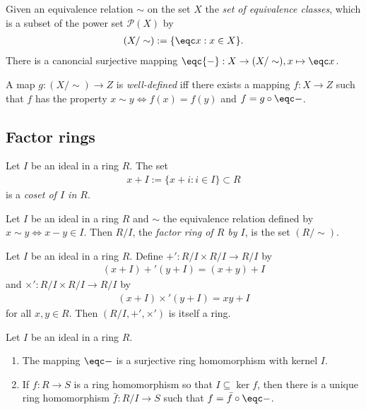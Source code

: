 \documentclass{article}
\begin{document}
\begin{definition}
	Given an equivalence relation $\sim$ on the set $X$ the \emph{set of equivalence classes},
	which is a subset of the power set $\mathcal{P}(X)$ by
	\begin{align*}
		(X/\sim) := \{\eqc x : x \in X\}.
	\end{align*}
	There is a canoncial surjective mapping $\eqc{-}:X\to (X/\sim),x\mapsto\eqc x$.
\end{definition}

\begin{definition}
	A map $g:(X/\sim)\to Z$ is \emph{well-defined} iff there exists a mapping $f:X\to Z$
	such that $f$ has the property $x\sim y\Leftrightarrow f(x)=f(y)$ and $f=g\circ\eqc-$.
\end{definition}

\subsection{Factor rings}

\begin{definition}
	Let $I$ be an ideal in a ring $R$. The set
	\begin{align*}
		x + I := \{x + i : i\in I\}\subset R
	\end{align*}
	is a \emph{coset of $I$ in $R$}.
\end{definition}

\begin{definition}
	Let $I$ be an ideal in a ring $R$ and $\sim$ the equivalence relation defined by
	$x\sim y\Leftrightarrow x-y\in I$. Then $R/I$, the \emph{factor ring of $R$ by $I$},
	is the set $(R/\sim)$.
\end{definition}

\begin{theorem}[Theorem 3.6.4]
	Let $I$ be an ideal in a ring $R$. Define $+':R/I\times R/I\to R/I$ by
	\begin{align*}
		(x+I)+'(y+I) = (x+y) + I
	\end{align*}
	and $\times' : R/I\times R/I\to R/I$ by
	\begin{align*}
		(x+I)\times' (y+I) = xy + I
	\end{align*}
	for all $x,y\in R$. Then $(R/I,+',\times')$ is itself a ring.
\end{theorem}

\begin{theorem}[Theorem 3.6.7]
	Let $I$ be an ideal in a ring $R$.
	\begin{enumerate}
		\item The mapping $\eqc -$ is a surjective ring homomorphism with kernel $I$.
		\item If $f:R\to S$ is a ring homomorphism so that $I\subseteq\ker f$, then there
		      is a unique ring homomorphism $\bar f:R/I\to S$ such that $f=\bar f\circ\eqc -$.
	\end{enumerate}
\end{theorem}
\end{document}
